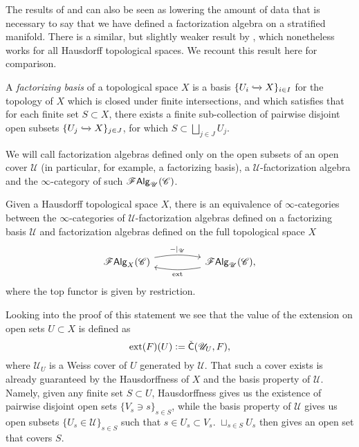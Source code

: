 \documentclass[../text]{subfiles}
\begin{document}
The results of  and  can also be seen as lowering the amount of data that is necessary to say that we have defined a factorization algebra on a stratified manifold. There is a similar, but slightly weaker result by \cite{cg2016}, which nonetheless works for all Hausdorff topological spaces. We recount this result here for comparison.

\begin{definition}
    A \emph{factorizing basis} of a topological space $X$ is a basis $\{ U_i \xhookrightarrow{} X\}_{i \in I}$ for the topology of $X$ which is closed under finite intersections, and which satisfies that for each finite set $S \subset X$, there exists a finite sub-collection of pairwise disjoint open subsets $\{ U_j \xhookrightarrow{} X\}_{j \in J}$, for which $S \subset \bigsqcup_{j \in J} U_j$.
\end{definition}

\begin{definition}
    We will call factorization algebras defined only on the open subsets of an open cover $\mathscr{U}$ (in particular, for example, a factorizing basis), a $\mathscr{U}$-factorization algebra and the $\infty$-category of such $\mathscr{F} \mathsf{Alg}_{\mathscr{U}}(\mathscr{C})$.
\end{definition}

\begin{theorem}[\cite{cg2016}]\label{thm:fa_from_basis}
    Given a Hausdorff topological space $X$, there is an equivalence of $\infty$-categories between the $\infty$-categories of $\mathscr{U}$-factorization algebras defined on a factorizing basis $\mathscr{U}$ and factorization algebras defined on the full topological space $X$
    \begin{equation}
        \begin{tikzcd}
            \falg_X(\catC) \arrow[rr, bend left=10, "\mathrm{-|_{\mathscr{U}}}"] &  & \falg_{\mathscr{U}}(\catC) \arrow[ll, bend left=10, "\mathrm{ext}"],
        \end{tikzcd}
    \end{equation}
    where the top functor is given by restriction.
\end{theorem}

\begin{remark}
    Looking into the proof of this statement we see that the value of the extension on open sets $U \subset X$ is defined as
    \begin{equation}
        \mathrm{ext}(F)(U) := \check{\mathsf{C}}(\mathscr{U}_U, F),
    \end{equation}
    where $\mathscr{U}_U$ is a Weiss cover of $U$ generated by $\mathscr{U}$. That such a cover exists is already guaranteed by the Hausdorffness of $X$ and the basis property of $\mathscr{U}$. Namely, given any finite set $S \subset U$, Hausdorffness gives us the existence of pairwise disjoint open sets $\{ V_s \ni s\}_{s \in S}$, while the basis property of $\mathscr{U}$ gives us open subsets $\{ U_s \in \mathscr{U} \}_{s \in S}$ such that $s \in U_s \subset V_s$. $\sqcup_{s \in S} U_s$ then gives an open set that covers $S$.
\end{remark}
\end{document}
